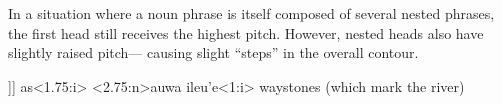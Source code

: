 In a situation where a noun phrase is itself composed of several nested phrases, the first head still receives the highest pitch. However, nested heads also have slightly raised pitch--- causing slight ``steps'' in the overall contour.


\begin{contour}
\preamble [wasi [nauwa [ileu'ei]]]
as<1.75:i> <2.75:n>auwa ileu'e<1:i>
\tr waystones (which mark the river)
\end{contour}


